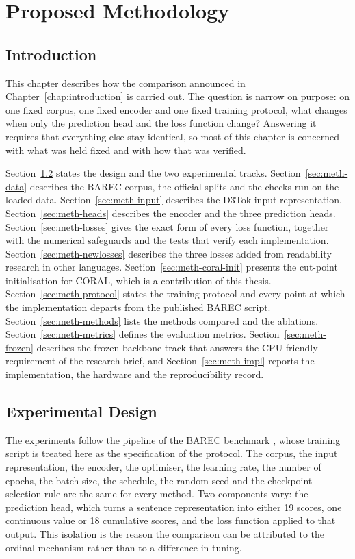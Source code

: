 \chapter{Proposed Methodology}
\label{chap:methodology}

\section{Introduction}

This chapter describes how the comparison announced in Chapter~\ref{chap:introduction} is
carried out. The question is narrow on purpose: on one fixed corpus, one fixed encoder and one
fixed training protocol, what changes when only the prediction head and the loss function
change? Answering it requires that everything else stay identical, so most of this chapter is
concerned with what was held fixed and with how that was verified.

Section~\ref{sec:meth-overview} states the design and the two experimental tracks.
Section~\ref{sec:meth-data} describes the BAREC corpus, the official splits and the checks run
on the loaded data. Section~\ref{sec:meth-input} describes the D3Tok input representation.
Section~\ref{sec:meth-heads} describes the encoder and the three prediction heads.
Section~\ref{sec:meth-losses} gives the exact form of every loss function, together with the
numerical safeguards and the tests that verify each implementation.
Section~\ref{sec:meth-newlosses} describes the three losses added from readability research in
other languages. Section~\ref{sec:meth-coral-init} presents the cut-point initialisation for CORAL, which is a
contribution of this thesis. Section~\ref{sec:meth-protocol} states the training protocol and
every point at which the implementation departs from the published BAREC script.
Section~\ref{sec:meth-methods} lists the methods compared and the ablations.
Section~\ref{sec:meth-metrics} defines the evaluation metrics.
Section~\ref{sec:meth-frozen} describes the frozen-backbone track that answers the
CPU-friendly requirement of the research brief, and Section~\ref{sec:meth-impl} reports the
implementation, the hardware and the reproducibility record.

\section{Experimental Design}
\label{sec:meth-overview}

The experiments follow the pipeline of the BAREC benchmark \cite{elmadani2025barec}, whose
training script is treated here as the specification of the protocol. The corpus, the input
representation, the encoder, the optimiser, the learning rate, the number of epochs, the batch
size, the schedule, the random seed and the checkpoint selection rule are the same for every
method. Two components vary: the prediction head, which turns a sentence representation into
either 19 scores, one continuous value or 18 cumulative scores, and the loss function applied
to that output. This isolation is the reason the comparison can be attributed to the ordinal
mechanism rather than to a difference in tuning.

